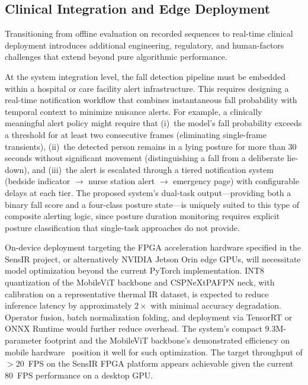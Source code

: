 \subsection{Clinical Integration and Edge Deployment}
\label{sec:outlook_clinical}

Transitioning from offline evaluation on recorded sequences to real-time clinical deployment introduces additional engineering, regulatory, and human-factors challenges that extend beyond pure algorithmic performance.

At the system integration level, the fall detection pipeline must be embedded within a hospital or care facility alert infrastructure. This requires designing a real-time notification workflow that combines instantaneous fall probability with temporal context to minimize nuisance alerts. For example, a clinically meaningful alert policy might require that (i)~the model's fall probability exceeds a threshold for at least two consecutive frames (eliminating single-frame transients), (ii)~the detected person remains in a lying posture for more than 30 seconds without significant movement (distinguishing a fall from a deliberate lie-down), and (iii)~the alert is escalated through a tiered notification system (bedside indicator $\to$ nurse station alert $\to$ emergency page) with configurable delays at each tier. The proposed system's dual-task output---providing both a binary fall score and a four-class posture state---is uniquely suited to this type of composite alerting logic, since posture duration monitoring requires explicit posture classification that single-task approaches do not provide.

On-device deployment targeting the FPGA acceleration hardware specified in the SensIR project, or alternatively NVIDIA Jetson Orin edge GPUs, will necessitate model optimization beyond the current PyTorch implementation. INT8 quantization of the MobileViT backbone and CSPNeXtPAFPN neck, with calibration on a representative thermal IR dataset, is expected to reduce inference latency by approximately $2\times$ with minimal accuracy degradation. Operator fusion, batch normalization folding, and deployment via TensorRT or ONNX Runtime would further reduce overhead. The system's compact 9.3M-parameter footprint and the MobileViT backbone's demonstrated efficiency on mobile hardware~\cite{mehta2022mobilevit} position it well for such optimization. The target throughput of $>$20~FPS on the SensIR FPGA platform appears achievable given the current 80~FPS performance on a desktop GPU.

